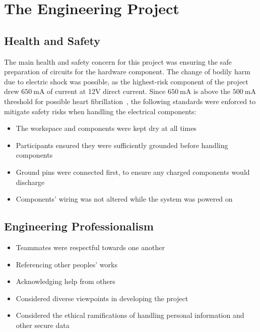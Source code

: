 \documentclass[12pt]{report}
\let\Oldsection\section
\renewcommand{\section}{\FloatBarrier\Oldsection}
\begin{document}

\chapter{The Engineering Project} \label{the-engineering-project}


\section{Health and Safety} \label{health-and-safety}

The main health and safety concern for this project was ensuring the safe preparation of circuits for the hardware 
component. The change of bodily harm due to electric shock was possible, as the highest-risk component of the project 
drew $\SI{650}{\milli\ampere}$ of current at 12V direct current. Since $\SI{650}{\milli\ampere}$ is above the 
$\SI{500}{\milli\ampere}$ threshold for possible heart fibrillation~\autocite{CURRENTDANGER}, the following standards
were enforced to mitigate safety risks when handling the electrical components:
\begin{itemize}
    \item The workspace and components were kept dry at all times
    \item Participants ensured they were sufficiently grounded before handling components
    \item Ground pins were connected first, to ensure any charged components would discharge
    \item Components' wiring was not altered while the system was powered on
\end{itemize}


\section{Engineering Professionalism} \label{engineering-professionalism}

\begin{itemize}
    \item Teammates were respectful towards one another
    \item Referencing other peoples' works
    \item Acknowledging help from others
    \item Considered diverse viewpoints in developing the project
    \item Considered the ethical ramifications of handling personal information and other secure data
\end{itemize}
\end{document}
